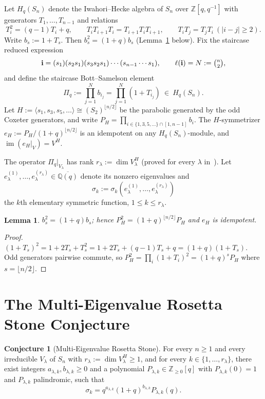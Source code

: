 \documentclass[11pt]{article}
\newtheorem{lemma}[theorem]{Lemma}
\theoremstyle{definition}
\newtheorem{conjecture}[theorem]{Conjecture}
\newcommand{\Pq}{\Pi_q}
\newcommand{\PH}{P_H}
\newcommand{\eH}{e_H}
\newcommand{\Hq}{H_q(S_n)}
\newcommand{\Z}{\mathbb{Z}}
\newcommand{\Q}{\mathbb{Q}}
\begin{document}
Let $\Hq$ denote the Iwahori--Hecke algebra of $S_n$ over $\Z[q,q^{-1}]$
with generators $T_1,\ldots,T_{n-1}$ and relations
\[
  T_i^2 = (q-1)T_i+q,\qquad
  T_iT_{i+1}T_i = T_{i+1}T_iT_{i+1},\qquad
  T_iT_j = T_jT_i\ (|i-j|\ge 2).
\]
Write $b_s:=1+T_s$. Then $b_s^2=(1+q)b_s$ (Lemma~\ref{lem:bs-idem}
below). Fix the staircase reduced expression
\[
  \mathbf{i} = (s_1)(s_2s_1)(s_3s_2s_1)\cdots(s_{n-1}\cdots s_1),
  \qquad \ell(\mathbf{i})=N:=\tbinom{n}{2},
\]
and define the staircase Bott--Samelson element
\[
  \Pq := \prod_{j=1}^{N} b_{i_j}
       = \prod_{j=1}^{N} (1+T_{i_j})\ \in\ \Hq.
\]
Let $H:=\langle s_1,s_3,s_5,\ldots\rangle\cong(S_2)^{\lfloor n/2\rfloor}$
be the parabolic generated by the odd Coxeter generators, and write
$\PH=\prod_{i\in\{1,3,5,\ldots\}\cap[1,n-1]}b_i$. The $H$-symmetrizer
$\eH:=\PH/(1+q)^{\lfloor n/2\rfloor}$ is an idempotent on any
$\Hq$-module, and $\operatorname{im}(\eH|_V)=V^H$.

The operator $\Pq|_{V_\lambda}$ has rank $r_\lambda:=\dim V_\lambda^H$
(proved for every $\lambda$ in~\cite{clio2026hinvariant}). Let
$e_\lambda^{(1)},\ldots,e_\lambda^{(r_\lambda)}\in\overline{\Q(q)}$
denote its nonzero eigenvalues and
\[
  \sigma_k := \sigma_k(e_\lambda^{(1)},\ldots,e_\lambda^{(r_\lambda)})
\]
the $k$th elementary symmetric function, $1\le k\le r_\lambda$.

\begin{lemma}\label{lem:bs-idem}
$b_s^2=(1+q)b_s$; hence $\PH^2=(1+q)^{\lfloor n/2\rfloor}\PH$ and $\eH$
is idempotent.
\end{lemma}
\begin{proof}
$(1+T_s)^2=1+2T_s+T_s^2=1+2T_s+(q-1)T_s+q=(1+q)(1+T_s)$.
Odd generators pairwise commute, so $\PH^2=\prod_i(1+T_i)^2=(1+q)^s\PH$
where $s=\lfloor n/2\rfloor$.
\end{proof}

\section{The Multi-Eigenvalue Rosetta Stone Conjecture}

\begin{conjecture}[Multi-Eigenvalue Rosetta Stone]\label{conj:main}
For every $n\ge 1$ and every irreducible $V_\lambda$ of $S_n$ with
$r_\lambda:=\dim V_\lambda^H\ge 1$, and for every
$k\in\{1,\ldots,r_\lambda\}$, there exist integers
$a_{\lambda,k},b_{\lambda,k}\ge 0$ and a polynomial
$P_{\lambda,k}\in\Z_{\ge 0}[q]$ with $P_{\lambda,k}(0)=1$ and
$P_{\lambda,k}$ palindromic, such that
\begin{equation}\label{eq:rosetta}
  \sigma_k = q^{a_{\lambda,k}}(1+q)^{b_{\lambda,k}}P_{\lambda,k}(q).
\end{equation}
\end{conjecture}
\end{document}

